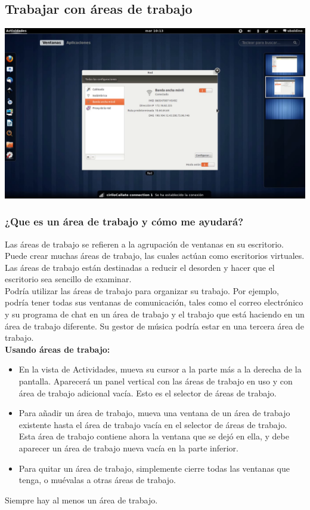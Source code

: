 \subsection{Trabajar con áreas de trabajo}
\begin{center}
\includegraphics[scale=0.3]{img/areasTr.png} 
\end{center}
\subsubsection{¿Que es un área de trabajo y cómo me ayudará?}
Las áreas de trabajo se refieren a la agrupación de ventanas en su escritorio. Puede crear muchas áreas de trabajo, las cuales actúan como escritorios virtuales. Las áreas de trabajo están destinadas a reducir el desorden y hacer que el escritorio sea sencillo de examinar.\\

Podría utilizar las áreas de trabajo para organizar su trabajo. Por ejemplo, podría tener todas sus ventanas de comunicación, tales como el correo electrónico y su programa de chat en un área de trabajo y el trabajo que está haciendo en un área de trabajo diferente. Su gestor de música podría estar en una tercera área de trabajo.\\

{\bf Usando áreas de trabajo:}
\begin{itemize}
\item En la vista de Actividades, mueva su cursor a la parte más a la derecha de la pantalla. Aparecerá un panel vertical con las áreas de trabajo en uso y con área de trabajo adicional vacía. Esto es el selector de áreas de trabajo.
\item Para añadir un área de trabajo, mueva una ventana de un área de trabajo existente hasta el área de trabajo vacía en el selector de áreas de trabajo. Esta área de trabajo contiene ahora la ventana que se dejó en ella, y debe aparecer un área de trabajo nueva vacía en la parte inferior.
\item Para quitar un área de trabajo, simplemente cierre todas las ventanas que tenga, o muévalas a otras áreas de trabajo.
\end{itemize}
Siempre hay al menos un área de trabajo.
